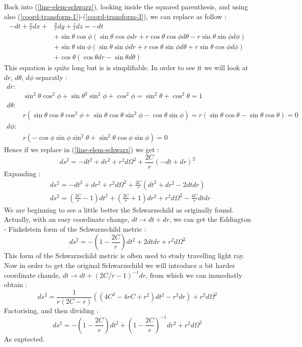\documentclass[a4paper,12pt]{article}
\theoremstyle{definition}
\begin{document}
Back into (\ref{line-elem-schwarz}), looking inside the squared parenthesis, and using also (\ref{coord-transform-1})-(\ref{coord-transform-3}), we can replace as follow :
\begin{align*}
	-dt+\frac{x}{r}dx+&\frac{y}{r}dy+\frac{z}{r}dz =-dt\\
	&+\sin{\theta} \cos{\phi} (\sin{\theta} \cos{\phi} dr+r\cos{\theta} \cos{\phi} d\theta -r\sin{\theta} \sin{\phi} d\phi )\\
	&+\sin{\theta} \sin{\phi} (\sin{\theta} \sin{\phi} dr+r\cos{\theta} \sin{\phi} d\theta +r\sin{\theta} \cos{\phi} d\phi )\\
	&+\cos{\theta} (\cos{\theta} dr-\sin{\theta} d\theta )
\end{align*}
This equation is quite long but is is simplifiable. In order to see it  we will look at $dr$, $d\theta$, $d\phi$ separatly :
\begin{align*}
	dr :& \\
	&\sin^2{\theta}\cos^2{\phi}+\sin{\theta}^2\sin^2{\phi}+\cos^2{\phi}=\sin^2{\theta}+\cos^2{\theta}=1\\
	d\theta :& \\
	&r(\sin{\theta}\cos{\theta}\cos^2{\phi}+\sin{\theta}\cos{\theta}\sin^2{\phi}-\cos{\theta}\sin{\phi})=r(\sin{\theta}\cos{\theta}-\sin{\theta}\cos{\theta})=0\\
	d\phi :& \\
	&r(-\cos{\phi}\sin{\phi}\sin^2{\theta}+\sin^2{\theta}\cos{\phi}\sin{\phi})=0
\end{align*}
Hence if we replace in (\ref{line-elem-schwarz}) we get :
\begin{equation*}
	ds^2=-dt^2+dr^2+r^2d\Omega^2+\frac{2C}{r}(-dt+dr)^2
\end{equation*}
Expanding :
\begin{align*}
	&ds^2=-dt^2+dr^2+r^2d\Omega^2+\frac{2C}{r}(dt^2+dr^2-2dtdr)\\
	&ds^2=(\frac{2C}{r}-1)dt^2+(\frac{2C}{r}+1)dr^2+r^2d\Omega^2-\frac{4C}{r}dtdr
\end{align*}
We are beginning to see a little better the Schwarzschild as originally found.
Actually, with an easy coordinate change, $dt\rightarrow dt+dr$, we can get the Eddington - Finkelstein form of the Schwarzschild metric :
\begin{equation}
	ds^2=-(1-\frac{2C}{r})dt^2+2dtdr+r^2d\Omega^2
\end{equation}
This form of the Schwarzschild metric is often used to study travelling light ray.
Now in order to get the original Schwarzschild we will introduce a bit harder coordinate chande, $dt\rightarrow dt+(2C/r-1)^{-1}dr$, from which we can immediatly obtain :
\begin{equation*}
	ds^2=\frac{1}{r(2C-r)}((4C^2-4rC+r^2)dt^2-r^2dr)+r^2d\Omega^2
\end{equation*}
Factorising, and then dividing :
\begin{equation}
	ds^2=-(1-\frac{2C}{r})dt^2+(1-\frac{2C}{r})^{-1}dr^2+r^2d\Omega^2
\end{equation}
As exptected.
\end{document}
